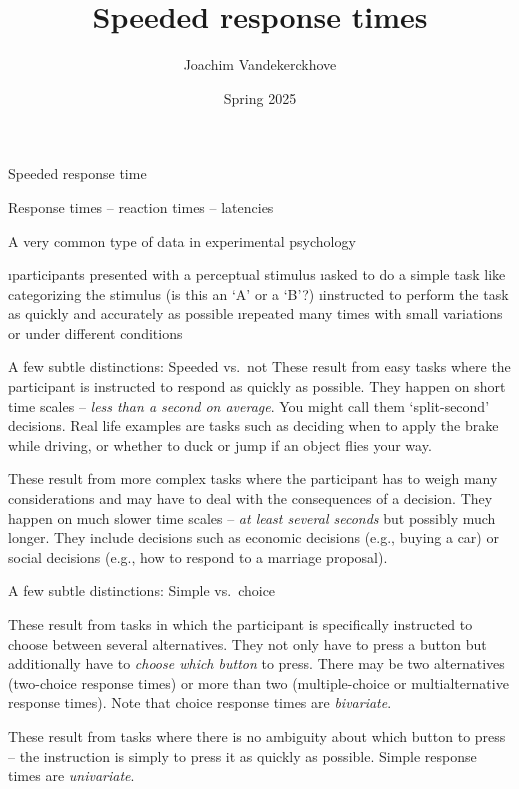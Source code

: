 \documentclass[aspectratio=169]{beamer}
\title{Speeded response times}
\author{Joachim Vandekerckhove}
\date{Spring 2025}
\begin{document}
\maketitle

\begin{frame}[fragile]{Speeded response time}

Response times -- reaction times -- latencies\\[2ex]\pause

A very common type of data in experimental psychology
\pause

\bi
\i participants presented with a perceptual stimulus
\i asked to do a simple task like categorizing the stimulus (is this an `A' or a `B'?)
\i instructed to perform the task as quickly and accurately as possible
\i repeated many times with small variations or under different conditions
\ei

\end{frame}


\begin{frame}[fragile]{A few subtle distinctions: Speeded vs.\ not}
\vspace{-4ex}
These result from easy tasks where the participant is instructed to respond as quickly as possible.  They happen on short time scales -- \emph{less than a second on average}.  You might call them `split-second' decisions.  Real life examples are tasks such as deciding when to apply the brake while driving, or whether to duck or jump if an object flies your way.
\xe\pause

\vspace{-2ex}
These result from more complex tasks where the participant has to weigh many considerations and may have to deal with the consequences of a decision.  They happen on much slower time scales -- \emph{at least several seconds} but possibly much longer.  They include decisions such as economic decisions (e.g., buying a car) or social decisions (e.g., how to respond to a marriage proposal).
\xe

\end{frame}



\begin{frame}[fragile]{A few subtle distinctions: Simple vs.\ choice}

These result from tasks in which the participant is specifically instructed to choose between several alternatives.  They not only have to press a button but additionally have to \emph{choose which button} to press.  There may be two alternatives (two-choice response times) or more than two (multiple-choice or multialternative response times).  Note that choice response times are \emph{bivariate}.
\xe\pause

These result from tasks where there is no ambiguity about which button to press -- the instruction is simply to press it as quickly as possible.  Simple response times are \emph{univariate}.
\xe

\end{frame}
\end{document}
